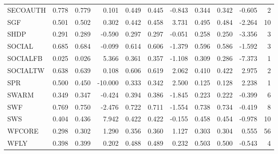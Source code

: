 \begin{tabular}{lrrrrrrrrrr}
SECOAUTH      & 0.778 &     0.779 &                0.101 &     0.449 &         0.445 &                   -0.843 &       0.344 &           0.342 &                     -0.605 &      2 \\
SGF           & 0.501 &     0.502 &                0.302 &     0.442 &         0.458 &                    3.731 &       0.495 &           0.484 &                     -2.264 &     10 \\
SHDP          & 0.291 &     0.289 &               -0.590 &     0.297 &         0.297 &                   -0.051 &       0.258 &           0.250 &                     -3.356 &      3 \\
SOCIAL        & 0.685 &     0.684 &               -0.099 &     0.614 &         0.606 &                   -1.379 &       0.596 &           0.586 &                     -1.592 &      3 \\
SOCIALFB      & 0.025 &     0.026 &                5.366 &     0.361 &         0.357 &                   -1.108 &       0.309 &           0.286 &                     -7.373 &      1 \\
SOCIALTW      & 0.638 &     0.639 &                0.108 &     0.606 &         0.619 &                    2.062 &       0.410 &           0.422 &                      2.975 &      2 \\
SPR           & 0.500 &     0.450 &              -10.000 &     0.333 &         0.342 &                    2.500 &       0.125 &           0.128 &                      2.238 &      1 \\
SWARM         & 0.349 &     0.347 &               -0.424 &     0.394 &         0.386 &                   -1.845 &       0.223 &           0.222 &                     -0.399 &      6 \\
SWF           & 0.769 &     0.750 &               -2.476 &     0.722 &         0.711 &                   -1.554 &       0.738 &           0.734 &                     -0.419 &      8 \\
SWS           & 0.404 &     0.436 &                7.942 &     0.422 &         0.422 &                   -0.155 &       0.458 &           0.454 &                     -0.978 &     10 \\
WFCORE        & 0.298 &     0.302 &                1.290 &     0.356 &         0.360 &                    1.127 &       0.303 &           0.304 &                      0.555 &     56 \\
WFLY          & 0.398 &     0.399 &                0.202 &     0.488 &         0.489 &                    0.232 &       0.503 &           0.500 &                     -0.543 &      4 \\
\bottomrule
\end{tabular}
